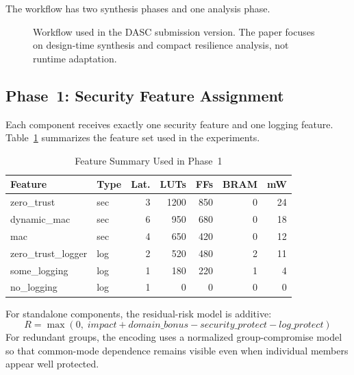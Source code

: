 \documentclass[conference]{IEEEtran}
\begin{document}
The workflow has two synthesis phases and one analysis phase.

\begin{figure}[t]
\centering
{}
\caption{Workflow used in the DASC submission version. The paper focuses on
design-time synthesis and compact resilience analysis, not runtime adaptation.}
\label{fig:workflow}
\end{figure}

\subsection{Phase~1: Security Feature Assignment}

Each component receives exactly one security feature and one logging feature.
Table~\ref{tab:features} summarizes the feature set used in the experiments.

\begin{table}[t]
\caption{Feature Summary Used in Phase~1}
\label{tab:features}
\centering
\scriptsize
\begin{tabular}{l l r r r r r}
\toprule
Feature & Type & Lat. & LUTs & FFs & BRAM & mW \\
\midrule
zero\_trust       & sec & 3 & 1200 & 850 & 0 & 24 \\
dynamic\_mac      & sec & 6 & 950  & 680 & 0 & 18 \\
mac               & sec & 4 & 650  & 420 & 0 & 12 \\
zero\_trust\_logger & log & 2 & 520  & 480 & 2 & 11 \\
some\_logging     & log & 1 & 180  & 220 & 1 & 4 \\
no\_logging       & log & 1 & 0    & 0   & 0 & 0 \\
\bottomrule
\end{tabular}
\end{table}

For standalone components, the residual-risk model is additive:
\begin{equation}
R = \max(0,\; \mathit{impact} + \mathit{domain\_bonus}
- \mathit{security\_protect} - \mathit{log\_protect})
\label{eq:risk}
\end{equation}
For redundant groups, the encoding uses a normalized group-compromise model so
that common-mode dependence remains visible even when individual members
appear well protected.
\end{document}
